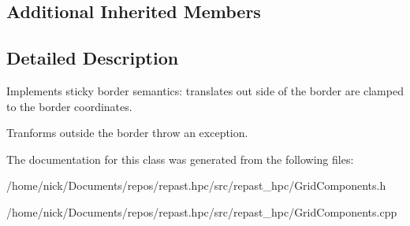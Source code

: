 \subsection*{Additional Inherited Members}


\subsection{Detailed Description}
Implements sticky border semantics\-: translates out side of the border are clamped to the border coordinates. 

Tranforms outside the border throw an exception. 

The documentation for this class was generated from the following files\-:\begin{DoxyCompactItemize}
\item 
/home/nick/\-Documents/repos/repast.\-hpc/src/repast\-\_\-hpc/Grid\-Components.\-h\item 
/home/nick/\-Documents/repos/repast.\-hpc/src/repast\-\_\-hpc/Grid\-Components.\-cpp\end{DoxyCompactItemize}
